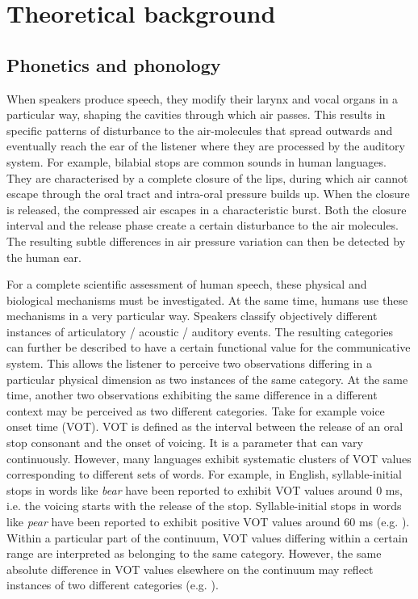\chapter{Theoretical background}
\section{Phonetics and phonology}\label{sec:2.1}
When speakers produce speech, they modify their larynx and vocal organs in a particular way, shaping the cavities through which air passes. This results in specific patterns of disturbance to the air-molecules that spread outwards and eventually reach the ear of the listener where they are processed by the auditory system. For example, bilabial stops are common sounds in human languages. They are characterised by a complete closure of the lips, during which air cannot escape through the oral tract and intra-oral pressure builds up. When the closure is released, the compressed air escapes in a characteristic burst. Both the closure interval and the release phase create a certain disturbance to the air molecules. The resulting subtle differences in air pressure variation can then be detected by the human ear.

For a complete scientific assessment of human speech, these physical and biological mechanisms must be investigated. At the same time, humans use these mechanisms in a very particular way. Speakers classify objectively different instances of articulatory / acoustic / auditory events. The resulting categories can further be described to have a certain functional value for the communicative system. This allows the listener to perceive two observations differing in a particular physical dimension as two instances of the same category. At the same time, another two observations exhibiting the same difference in a different context may be perceived as two different categories. Take for example voice onset time (VOT). VOT is defined as the interval between the release of an oral stop consonant and the onset of voicing. It is a parameter that can vary continuously. However, many languages exhibit systematic clusters of VOT values corresponding to different sets of words. For example, in English, syllable-initial stops in words like \textit{bear} have been reported to exhibit VOT values around 0 ms, i.e. the voicing starts with the release of the stop. Syllable-initial stops in words like \textit{pear} have been reported to exhibit positive VOT values around 60 ms (e.g. \citealt{LiskerAbramson1964}). Within a particular part of the continuum, VOT values differing within a certain range are interpreted as belonging to the same category. However, the same absolute difference in VOT values elsewhere on the continuum may reflect instances of two different categories (e.g. \citealt{Liberman.etal1957}). 


